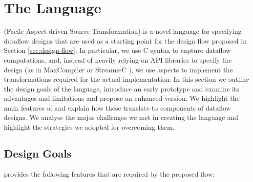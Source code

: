 \chapter{The \FAST{} Language}
\label{sec:fast}

\FAST{} (Facile Aspect-driven Source Transformation) is a novel
language for specifying dataflow designs that are used as a starting
point for the design flow proposed in Section
\ref{sec:design-flow}. In particular, we use C syntax to capture
dataflow computations, and, instead of heavily relying on API
libraries to specify the design (as in MaxCompiler \cite{5719584} or
Streams-C \cite{Gokhale:Stone:Arnold:Kalinowski:2000}), we use aspects
to implement the transformations required for the actual
implementation.  In this section we outline the design goals of the
language, introduce an early prototype and examine its advantages and
limitations and propose an enhanced version. We highlight the main
features of \FAST{} and explain how these translate to components of
dataflow designs. We analyse the major challenges we met in creating
the \FAST{} language and highlight the strategies we adopted for
overcoming them.

\section{Design Goals}

\FAST{} provides the following features that are
required by the proposed flow:

